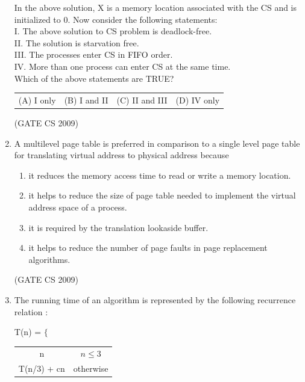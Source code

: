 \documentclass[a4paper, 11pt]{article}
\begin{document}
\begin{enumerate}
\begin{lstlisting}
    \end{lstlisting}
    In the above solution, X is a memory location associated with the CS and is initialized to 0. Now consider the following statements:\\
    I. The above solution to CS problem is deadlock-free.\\
    II. The solution is starvation free.\\
    III. The processes enter CS in FIFO order.\\
    IV. More than one process can enter CS at the same time.\\
    Which of the above statements are TRUE?\\
    \begin{tabularx}{\textwidth}{@{}XXXX@{}}
       (A) I only  & (B) I and II & (C) II and III & (D) IV only  \\
    \end{tabularx}

    \hfill (GATE CS 2009)
    
    \item A multilevel page table is preferred in comparison to a single level page table for translating virtual address to physical address because
    \begin{enumerate}[label=(\Alph*)]
        \item  it reduces the memory access time to read or write a memory location.
        \item it helps to reduce the size of page table needed to implement the virtual address space of a process. 
        \item it is required by the translation lookaside buffer.
        \item it helps to reduce the number of page faults in page replacement algorithms.
    \end{enumerate}

    \hfill (GATE CS 2009)

    \item The running time of an algorithm is represented by the following recurrence relation :\\
    
    \begin{center}
        T(n) = $\Biggl\{$
        \begin{tabular}{cc}
        n & $n \leq3$\\
        T(n/3) + cn & otherwise
    \end{tabular}\\
    \end{center}


\end{enumerate}
\end{document}
